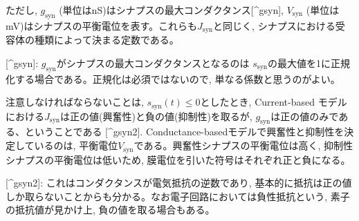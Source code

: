ただし, $g_{\text{syn}}$ (単位はnS)はシナプスの最大コンダクタンス[^gsyn], $V_{\text{syn}}$ (単位はmV)はシナプスの平衡電位を表す。これらも$J_{\text{syn}}$と同じく, シナプスにおける受容体の種類によって決まる定数である。



[^gsyn]: $g_{\text{syn}}$がシナプスの最大コンダクタンスとなるのは $s_{\text{syn}}$の最大値を1に正規化する場合である。正規化は必須ではないので, 単なる係数と思うのがよい。



注意しなければならないことは, $s_{\text{syn}}(t)\leq 0$としたとき, Current-based モデルにおける$J_{\text{syn}}$は正の値(興奮性)と負の値(抑制性)を取るが, $g_{\text{syn}}$は正の値のみである、ということである [^gsyn2]. Conductance-basedモデルで興奮性と抑制性を決定しているのは, 平衡電位$V_{\text{syn}}$である。興奮性シナプスの平衡電位は高く, 抑制性シナプスの平衡電位は低いため, 膜電位を引いた符号はそれぞれ正と負になる。



[^gsyn2]: これはコンダクタンスが電気抵抗の逆数であり, 基本的に抵抗は正の値しか取らないことからも分かる。なお電子回路においては負性抵抗という,  素子の抵抗値が見かけ上, 負の値を取る場合もある。

